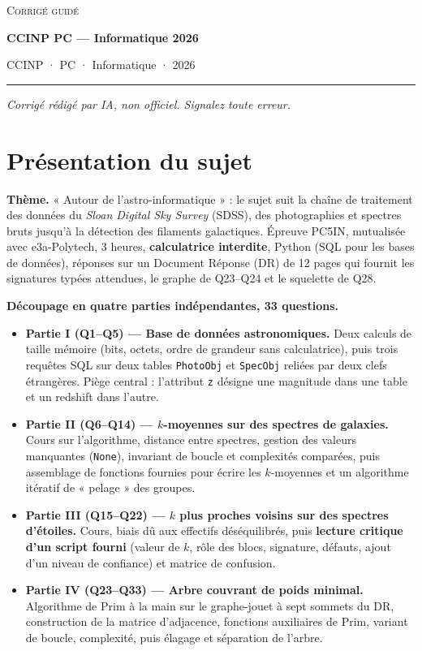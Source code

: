 \documentclass[11pt,a4paper]{article}
\providecommand{\tightlist}{\setlength{\itemsep}{0pt}\setlength{\parskip}{0pt}}
\begin{document}
\thispagestyle{plain}
\begin{center}
  {\small\scshape Corrigé guidé}\par\smallskip
  {\LARGE\bfseries CCINP PC — Informatique 2026\par}\medskip
  {\large CCINP · PC · Informatique · 2026\par}
\end{center}
\vspace{2pt}\hrule\vspace{8pt}

\emph{Corrigé rédigé par IA, non officiel. Signalez toute erreur.}

\hypertarget{pruxe9sentation-du-sujet}{%
\section{Présentation du sujet}\label{pruxe9sentation-du-sujet}}

\textbf{Thème.} « Autour de l'astro-informatique » : le sujet suit la chaîne de traitement des données du \emph{Sloan Digital Sky Survey} (SDSS), des photographies et spectres bruts jusqu'à la détection des filaments galactiques. Épreuve PC5IN, mutualisée avec e3a-Polytech, 3 heures, \textbf{calculatrice interdite}, Python (SQL pour les bases de données), réponses sur un Document Réponse (DR) de 12 pages qui fournit les signatures typées attendues, le graphe de Q23--Q24 et le squelette de Q28.

\textbf{Découpage en quatre parties indépendantes, 33 questions.}

\begin{itemize}
\tightlist
\item
  \textbf{Partie I (Q1--Q5) --- Base de données astronomiques.} Deux calculs de taille mémoire (bits, octets, ordre de grandeur sans calculatrice), puis trois requêtes SQL sur deux tables \texttt{PhotoObj} et \texttt{SpecObj} reliées par deux clefs étrangères. Piège central : l'attribut \texttt{z} désigne une magnitude dans une table et un redshift dans l'autre.
\item
  \textbf{Partie II (Q6--Q14) --- \(k\)-moyennes sur des spectres de galaxies.} Cours sur l'algorithme, distance entre spectres, gestion des valeurs manquantes (\texttt{None}), invariant de boucle et complexités comparées, puis assemblage de fonctions fournies pour écrire les \(k\)-moyennes et un algorithme itératif de « pelage » des groupes.
\item
  \textbf{Partie III (Q15--Q22) --- \(k\) plus proches voisins sur des spectres d'étoiles.} Cours, biais dû aux effectifs déséquilibrés, puis \textbf{lecture critique d'un script fourni} (valeur de \(k\), rôle des blocs, signature, défauts, ajout d'un niveau de confiance) et matrice de confusion.
\item
  \textbf{Partie IV (Q23--Q33) --- Arbre couvrant de poids minimal.} Algorithme de Prim à la main sur le graphe-jouet à sept sommets du DR, construction de la matrice d'adjacence, fonctions auxiliaires de Prim, variant de boucle, complexité, puis élagage et séparation de l'arbre.
\end{itemize}
\end{document}
